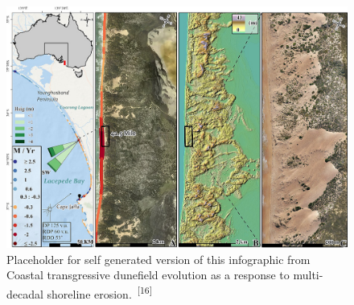 \documentclass{article}
\begin{document}

\begin{figure}
    \centering
    \includegraphics[width=.9\linewidth]{images/dunes.jpg}
    \caption{Placeholder for self generated version of this infographic from Coastal transgressive dunefield evolution as a response to multi-decadal shoreline erosion.~\textsuperscript{[16]}}
    \label{figure8}
\end{figure}

\end{document}

